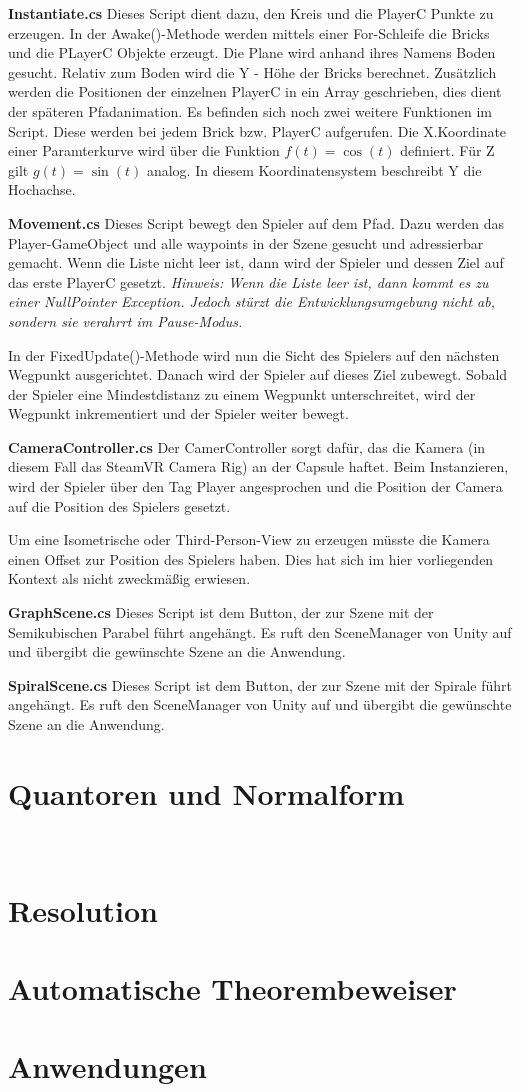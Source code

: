 \textbf{Instantiate.cs}
Dieses Script dient dazu, den Kreis und die PlayerC Punkte zu erzeugen. In der Awake()-Methode werden mittels einer For-Schleife
die Bricks und die PLayerC Objekte erzeugt. Die Plane wird anhand ihres Namens \glqq Boden{}\grqq{} gesucht. Relativ zum Boden wird die Y - Höhe der Bricks berechnet.
Zusätzlich werden die Positionen der einzelnen PlayerC in ein Array geschrieben, dies dient der späteren Pfadanimation.
Es befinden sich noch zwei weitere Funktionen im Script. Diese werden bei jedem Brick bzw. PlayerC aufgerufen. Die X.Koordinate einer Paramterkurve wird über die Funktion $ f(t) = \cos(t) $ definiert. Für Z gilt $g(t) = \sin(t)$ analog. In diesem Koordinatensystem beschreibt Y die Hochachse.

\textbf{Movement.cs}
Dieses Script bewegt den Spieler auf dem Pfad. Dazu werden das Player-GameObject und alle waypoints in der Szene gesucht und adressierbar gemacht.
Wenn die Liste nicht leer ist, dann wird der Spieler und dessen Ziel auf das erste PlayerC gesetzt. 
\emph{Hinweis: Wenn die Liste leer ist, dann kommt es zu einer NullPointer Exception. Jedoch stürzt die Entwicklungsumgebung nicht ab, sondern sie verahrrt im Pause-Modus.}

In der FixedUpdate()-Methode wird nun die Sicht des Spielers auf den nächsten Wegpunkt ausgerichtet. Danach wird der Spieler auf dieses Ziel zubewegt. Sobald der Spieler eine Mindestdistanz zu einem Wegpunkt unterschreitet, wird der Wegpunkt inkrementiert und der Spieler weiter bewegt.

\textbf{CameraController.cs}
Der CamerController sorgt dafür, das die Kamera (in diesem Fall das SteamVR Camera Rig) an der Capsule haftet. Beim Instanzieren, wird der Spieler über den Tag \glqq Player\grqq{} angesprochen und die Position der Camera auf die Position des Spielers gesetzt. 

Um eine Isometrische oder Third-Person-View zu erzeugen müsste die Kamera einen Offset zur Position des Spielers haben. Dies hat sich im hier vorliegenden Kontext als nicht zweckmäßig erwiesen. 

\textbf{GraphScene.cs}
Dieses Script ist dem Button, der zur Szene mit der Semikubischen Parabel führt angehängt. Es ruft den SceneManager von Unity auf und übergibt die gewünschte Szene an die Anwendung.

\textbf{SpiralScene.cs}
Dieses Script ist dem Button, der zur Szene mit der Spirale führt angehängt. Es ruft den SceneManager von Unity auf und übergibt die gewünschte Szene an die Anwendung.


\section{Quantoren und Normalform}
\
\section{Resolution}
\label{Resolution}

\section{Automatische Theorembeweiser}
\label{Automatische Theorembeweiser}


\section{Anwendungen}
\label{Anwendung}
